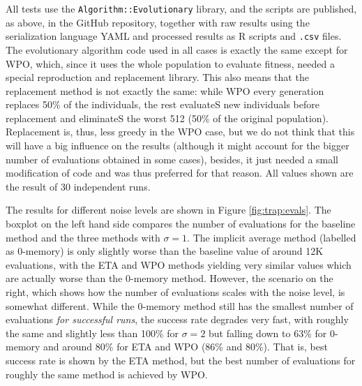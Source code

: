 \documentclass{svmult}
\begin{document}
%
All tests use the {\tt Algorithm::Evolutionary} library, and the scripts
are published, as above, in the GitHub repository, together with raw
results using the serialization language YAML
and processed results as R scripts and {\tt .csv} files. The evolutionary algorithm code used in all
cases is exactly the same except for WPO, which, since it uses the
whole population to evaluate fitness, needed a special reproduction
and replacement library. This also means that the replacement method
is not exactly the same: while WPO every generation replaces  50\% of
the individuals, the rest evaluateS new individuals before replacement
and eliminateS the worst 512 (50\% of the original
population). 
Replacement is, thus, less greedy in the WPO case, but
we do not think that this will have a big influence on the results
(although it might account for the bigger number of evaluations obtained in some
cases), besides, it just needed a small modification of code and was
thus preferred for that reason. All values shown are the result of 30
independent runs.

The results for different noise levels are shown in Figure
\ref{fig:trap:evals}. The boxplot on the left hand side compares the
number of evaluations for the baseline method and the three methods
with  $\sigma=1$. The implicit average method (labelled as 0-memory) is
only slightly worse than the baseline value of around 12K evaluations,
with the ETA and WPO methods yielding very similar values which are
actually worse than the 0-memory method. However, the scenario on the
right,
 which shows how the number of evaluations scales with the noise
level, is somewhat different. 
While the 0-memory method still has the
smallest number of evaluations {\em for successful runs}, the success
rate degrades very fast, with roughly the same and slightly less than
100\% for $\sigma=2$ but falling down to 63\% for 0-memory and around
80\% for ETA and WPO (86\% and 80\%). That is, best success rate is
shown by the ETA method, but the best number of evaluations for
roughly the same method is achieved by WPO. 
\end{document}
